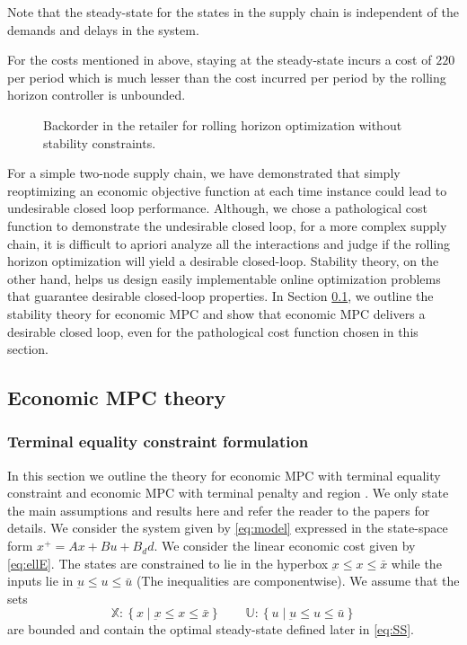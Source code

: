 \documentclass[10pt]{article}
\newcommand{\set}[1]{\left\lbrace #1 \right\rbrace}
\theoremstyle{definition}
\begin{document}
Note that  the steady-state for the states in the supply
chain is independent of the demands and delays in the system.

For the costs mentioned
in above, staying at the steady-state incurs a cost of $220$ per period
which is much lesser than the cost incurred per period by the rolling
horizon controller is unbounded.

\begin{figure}
\centering
\scriptsize
\resizebox{\textwidth}{!}{}
\caption{Backorder in the retailer for rolling horizon optimization
  without stability constraints.}
\label{fig:unstable_SC}
\end{figure}
For a simple two-node supply chain, we have demonstrated that simply
reoptimizing an economic objective function at each time instance
could lead to undesirable closed loop performance. Although, we chose
a pathological cost function to demonstrate the undesirable closed
loop, for a more complex supply chain, it is difficult to apriori
analyze all the interactions and judge if the rolling horizon
optimization will yield a desirable closed-loop. Stability theory, on
the other hand, helps us design easily implementable online 
optimization problems that guarantee desirable closed-loop
properties. In Section \ref{sec:economicMPC_theory}, we outline the
stability theory for economic MPC and show that economic MPC
delivers a desirable closed loop, even for the pathological cost
function chosen in this section.

\subsection{Economic MPC theory}
\label{sec:economicMPC_theory}
\subsubsection{Terminal equality constraint formulation}
\label{subsec:terminal_equality}
In this section we outline the theory for economic MPC with terminal
equality constraint \citep{diehl:amrit:rawlings:2011} and economic MPC
with terminal penalty and region
\citep{amrit:rawlings:angeli:2011}. We only state the main
  assumptions and results here and refer the reader to the papers for
  details.
We consider the system given by \eqref{eq:model} expressed in the
state-space form $x^+=Ax+Bu+B_dd$. We consider the linear economic
cost given by \eqref{eq:ellE}. The states are constrained to lie in
the hyperbox $\underbar{x} \leq x \leq \bar{x}$ while the inputs lie in
$\underbar{u} \leq u \leq \bar{u}$ (The inequalities are
componentwise). We assume that the sets 
\[\mathbb{X}: \set{x \mid \underbar{x} \leq x \leq  \bar{x}} \qquad \mathbb{U}: \set{u \mid \underbar{u} \leq u \leq \bar{u}}\] are
bounded and contain the optimal steady-state defined later in
\eqref{eq:SS}.
\end{document}

